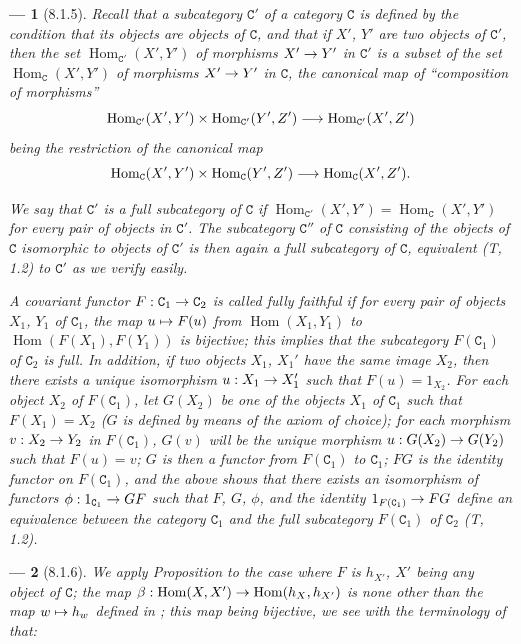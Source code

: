 \documentclass[oneside]{amsart}
\theoremstyle{ega-env-style}
\newtheorem*{env}{---}
\theoremstyle{ega-thm-env-style}
\theoremstyle{ega-defn-env-style}
\def\cat{\mathtt}                   %
\def\vphi{\phi}                     %
\def\C{\cat{C}}                     %
\def\Hom{\operatorname{Hom}}
\renewcommand{\to}{\mathchoice{\longrightarrow}{\rightarrow}{\rightarrow}{\rightarrow}}
\let\mapstoo\mapsto
\renewcommand{\mapsto}{\mathchoice{\longmapsto}{\mapstoo}{\mapstoo}{\mapstoo}}
\newcommand{\oldpage}[2][]{{\marginnote{\normalfont{\textbf{#1}~|~#2}}}\ignorespaces}
\let\EGAOriginalLabel\label
\renewcommand{\label}[1]{\phantomsection\EGAOriginalLabel{#1}}
\begin{document}
\begin{env}[8.1.5]
\label{0.8.1.5}
Recall that a \emph{subcategory} $\C'$ of a category $\C$ is defined by the condition that its objects
are objects of $\C$, and that if $X'$, $Y'$ are two objects of $\C'$, then the set
$\Hom_{\C'}(X',Y')$ of morphisms $X'\to Y'$ \emph{in $\C'$} is a subset of the set $\Hom_\C(X',Y')$ of
morphisms $X'\to Y'$ \emph{in $\C$}, the canonical map of ``composition of morphisms''
\[
  \Hom_{\C'}(X',Y')\times\Hom_{\C'}(Y',Z')\to\Hom_{\C'}(X',Z')
\]
\oldpage[0\textsubscript{III}]{7}
being the restriction of the canonical map
\[
  \Hom_\C(X',Y')\times\Hom_\C(Y',Z')\to\Hom_\C(X',Z').
\]

We say that $\C'$ is a \emph{full} subcategory of $\C$ if $\Hom_{\C'}(X',Y')=\Hom_\C(X',Y')$ for every
pair of objects in $\C'$. The subcategory $\C''$ of $\C$ consisting of the objects of $\C$ isomorphic to
objects of $\C'$ is then again a full subcategory of $\C$, \emph{equivalent} (T, 1.2) to $\C'$ as we
verify easily.

A covariant functor $F:\C_1\to\C_2$ is called \emph{fully faithful} if for every pair of objects
$X_1$, $Y_1$ of $\C_1$, the map $u\mapsto F(u)$ from $\Hom(X_1,Y_1)$ to $\Hom(F(X_1),F(Y_1))$ is
\emph{bijective}; this implies that the subcategory $F(\C_1)$ of $\C_2$ is \emph{full}. In addition,
if two objects $X_1$, $X_1'$ have the same image $X_2$, then there exists a unique isomorphism
$u:X_1\to X_1'$ such that $F(u)=1_{X_2}$. For each object $X_2$ of $F(\C_1)$, let $G(X_2)$ be one of
the objects $X_1$ of $\C_1$ such that $F(X_1)=X_2$ ($G$ is defined by means of the axiom of choice); for
each morphism $v:X_2\to Y_2$ in $F(\C_1)$, $G(v)$ will be the unique morphism $u:G(X_2)\to G(Y_2)$ such
that $F(u)=v$; $G$ is then a \emph{functor} from $F(\C_1)$ to $\C_1$; $FG$ is the identity functor on
$F(\C_1)$, and the above shows that there exists an isomorphism of functors $\vphi:1_{\C_1}\to GF$
such that $F$, $G$, $\vphi$, and the identity $1_{F(\C_1)}\to FG$ define an \emph{equivalence} between
the category $\C_1$ and the full subcategory $F(\C_1)$ of $\C_2$ (T, 1.2).
\end{env}

\begin{env}[8.1.6]
\label{0.8.1.6}
We apply Proposition  to the case where $F$ is $h_{X'}$, $X'$ being any
object of $\C$; the map $\beta:\Hom(X,X')\to\Hom(h_X,h_{X'})$ is none other than the map
$w\mapsto h_w$ defined in ; this map being \emph{bijective}, we see
with the terminology of  that:
\end{env}
\end{document}
